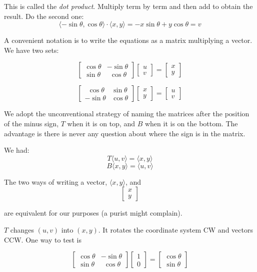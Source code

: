 \documentclass[11pt, oneside]{article}
\begin{document}
This is called the \emph{dot product}.  Multiply term by term and then add to obtain the result.  Do the second one:
\[ \langle -\sin \theta, \cos \theta \rangle \cdot \langle x,y \rangle = - x \sin \theta + y \cos \theta = v \]

A convenient notation is to write the equations as a matrix multiplying a vector.  We have two sets:

\[
\begin{bmatrix}  
\cos \theta & -\sin \theta \\
\sin \theta & \ \  \cos \theta
\end{bmatrix}
\begin{bmatrix}  
u \\
v
\end{bmatrix}
=
\begin{bmatrix}  
x \\
y
\end{bmatrix}
\]


\[
\begin{bmatrix}  
\ \ \cos \theta & \sin \theta \\
-\sin \theta & \cos \theta
\end{bmatrix}
\begin{bmatrix}  
x \\
y
\end{bmatrix}
=
\begin{bmatrix}  
u \\
v
\end{bmatrix}
\]

We adopt the unconventional strategy of naming the matrices after the position of the minus sign, $T$ when it is on top, and $B$ when it is on the bottom.  The advantage is there is never any question about where the sign is in the matrix.

We had:
\[ T  \langle u,v \rangle = \langle x,y \rangle \]
\[ B  \langle x,y \rangle = \langle u,v \rangle \]

The two ways of writing a vector,  $\langle x,y \rangle$, and 
\[
\begin{bmatrix}  
x \\
y
\end{bmatrix}
\]

are equivalent for our purposes (a purist might complain).

$T$ changes $(u,v)$ into $(x,y)$.  It rotates the coordinate system CW and vectors CCW.   One way to test is

\[
\begin{bmatrix}  
\cos \theta & -\sin \theta \\
\sin \theta & \ \ \cos \theta
\end{bmatrix}
\begin{bmatrix}
1 \\
0
\end{bmatrix}
=
\begin{bmatrix}  
\cos \theta \\
\sin \theta
\end{bmatrix}
\]
\end{document}
